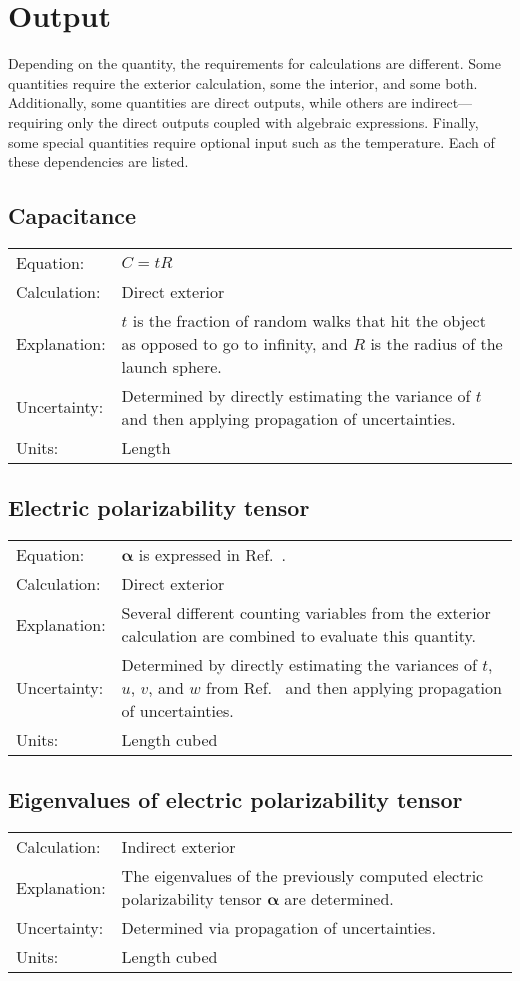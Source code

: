 \documentclass[12pt,letterpaper]{article}
\begin{document}
\section{Output}

Depending on the quantity, the requirements for calculations are different. Some quantities require the exterior calculation, some the interior, and some both. Additionally, some quantities are direct outputs, while others are indirect---requiring only the direct outputs coupled with algebraic expressions. Finally, some special quantities require optional input such as the temperature. Each of these dependencies are listed.

\subsection{Capacitance}
\begin{tabular}{p{1in} p{5.5in}}
Equation: & $C = tR$\\
Calculation: & Direct exterior  \\
Explanation: & $t$ is the fraction of random walks that hit the object as opposed to go to infinity, and $R$ is the radius of the launch sphere. \\
Uncertainty: & Determined by directly estimating the variance of $t$ and then applying propagation of uncertainties. \\
Units: & Length \\
\end{tabular}

\subsection{Electric polarizability tensor}
\begin{tabular}{p{1in} p{5.5in}}
Equation: & $\mathbf{\alpha}$ is expressed in Ref.~\cite{Mansfield2001}.\\
Calculation: & Direct exterior  \\
Explanation: & Several different counting variables from the exterior calculation are combined to evaluate this quantity. \\
Uncertainty: & Determined by directly estimating the variances of $t$, $u$, $v$, and $w$ from Ref.~\cite{Mansfield2001} and then applying propagation of uncertainties. \\
Units: & Length cubed \\
\end{tabular}

\subsection{Eigenvalues of electric polarizability tensor}
\begin{tabular}{p{1in} p{5.5in}}
Calculation: & Indirect exterior  \\
Explanation: & The eigenvalues of the previously computed electric polarizability tensor $\mathbf{\alpha}$ are determined. \\
Uncertainty: & Determined via propagation of uncertainties. \\
Units: & Length cubed\\
\end{tabular}
\end{document}
